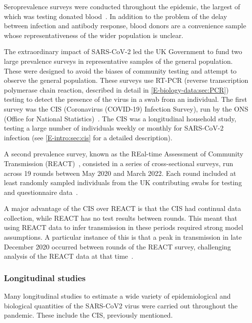 \documentclass[thesis.tex]{subfiles}
\begin{document}
Seroprevalence surveys were conducted throughout the epidemic, the largest of which was testing donated blood~\autocite{amirthalingamSeroprevalence}.
In addition to the problem of the delay between infection and antibody response, blood donors are a convenience sample whose representativeness of the wider population is unclear.

The extraordinary impact of SARS-CoV-2 led the UK Government to fund two large prevalence surveys in representative samples of the general population.
These were designed to avoid the biases of community testing and attempt to observe the general population.
These surveys use RT-PCR (reverse transcription polymerase chain reaction, described in detail in \cref{E-biology-data:sec:PCR}) testing to detect the presence of the virus in a swab from an individual.
The first survey was the CIS (Coronavirus (COVID-19) Infection Survey), run by the ONS (Office for National Statistics)~\autocite{CIS,cisMethodsONS}.
The CIS was a longitudinal household study, testing a large number of individuals weekly or monthly for SARS-CoV-2 infection (see \cref{E-intro:sec:cis} for a detailed description).

A second prevalence survey, known as the REal-time Assessment of Community Transmission (REACT)~\autocite{rileyResurgence,rileyREACT},
consisted in a series of cross-sectional surveys, run across 19 rounds between May 2020 and March 2022.
Each round included at least  randomly sampled individuals from the UK contributing swabs for testing and questionnaire data~\autocite{elliottTwin}.

A major advantage of the CIS over REACT is that the CIS had continual data collection, while REACT has no test results between rounds.
This meant that using REACT data to infer transmission in these periods required strong model assumptions.
A particular instance of this is that a peak in transmission in late December 2020 occurred between rounds of the REACT survey, challenging analysis of the REACT data at that time~\autocite{rileyREACTround8}.

\subsubsection{Longitudinal studies}

Many longitudinal studies to estimate a wide variety of epidemiological and biological quantities of the SARS-CoV2 virus were carried out throughout the pandemic.
These include the CIS, previously mentioned.
\end{document}
